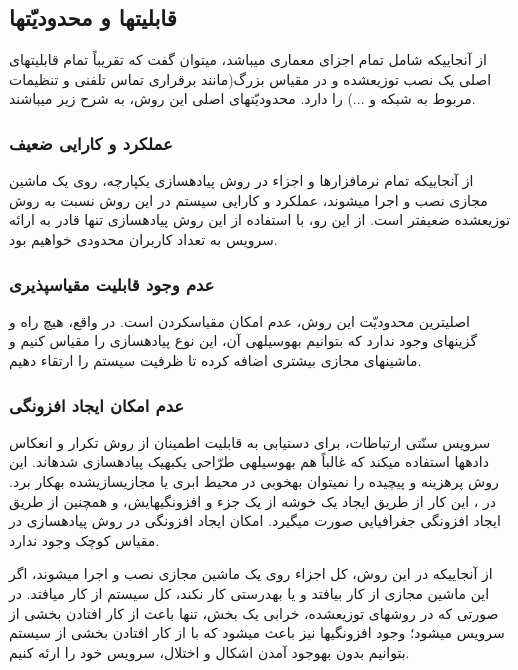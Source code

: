 {\subsection{قابلیت\nf ها و محدودیّت\nf ها}
از آنجایی\nf که  شامل تمام اجزای معماری  می\nf باشد، می\nf توان گفت که تقریباً تمام قابلیت\nf های اصلی یک نصب توزیع\nf شده و در مقیاس بزرگ(مانند برقراری تماس تلفنی و تنظیمات مربوط به شبکه و ...) را دارد. محدودیّت\nf های اصلی این روش، به شرح زیر می\nf باشند.

\subsubsection{عملکرد و کارایی ضعیف}
از آن\nf جایی\nf که تمام نرم\nf افزارها و اجزاء در روش پیاده\nf سازی یکپارچه، روی یک ماشین مجازی نصب و اجرا می\nf شوند، عملکرد و کارایی سیستم در این روش نسبت به روش توزیع\nf شده ضعیف\nf تر است. از این رو، با استفاده از این روش پیاده\nf سازی تنها قادر به ارائه سرویس به تعداد کاربران محدودی خواهیم بود. 

\subsubsection{عدم وجود قابلیت مقیاس\nf پذیری}
اصلی\nf ترین محدودیّت این روش، عدم امکان مقیاس\nf کردن است. در واقع، هیچ راه و گزینه\nf ای وجود ندارد که بتوانیم به\nf وسیله\nf ی آن، این نوع پیاده\nf سازی  را مقیاس کنیم و ماشین\nf های مجازی بیشتری اضافه کرده تا ظرفیت سیستم را ارتقاء دهیم.

\subsubsection{عدم امکان ایجاد افزونگی}

سرویس سنّتی ارتباطات، برای دستیابی به قابلیت اطمینان از روش تکرار و انعکاس داده\nf ها استفاده می\nf کند که غالباً هم به\nf وسیله\nf ی طرّاحی یک\nf به\nf یک پیاده\nf سازی شده\nf اند. این روش پرهزینه و پیچیده را نمی\nf توان به\nf خوبی در محیط ابری یا مجازی\nf سازی\nf شده به\nf کار برد. در ، این کار از طریق ایجاد یک خوشه از یک جزء و افزونگی\nf هایش، و هم\nf چنین از طریق ایجاد افزونگی جغرافیایی صورت می\nf گیرد. امکان ایجاد افزونگی در روش پیاده\nf سازی در مقیاس کوچک وجود ندارد.

از آن\nf جایی\nf که در این روش، کل اجزاء روی یک ماشین مجازی نصب و اجرا می\nf شوند، اگر این ماشین مجازی از کار بیافتد و یا به\nf درستی کار نکند، کل سیستم از کار می\nf افتد. در صورتی که در روش\nf های توزیع\nf شده، خرابی یک بخش، تنها باعث از کار افتادن بخشی از سرویس می\nf شود؛ وجود افزونگی\nf ها نیز باعث می\nf شود که با از کار افتادن بخشی از سیستم بتوانیم بدون به\nf وجود آمدن اشکال و اختلال، سرویس خود را ارئه کنیم.  

}
